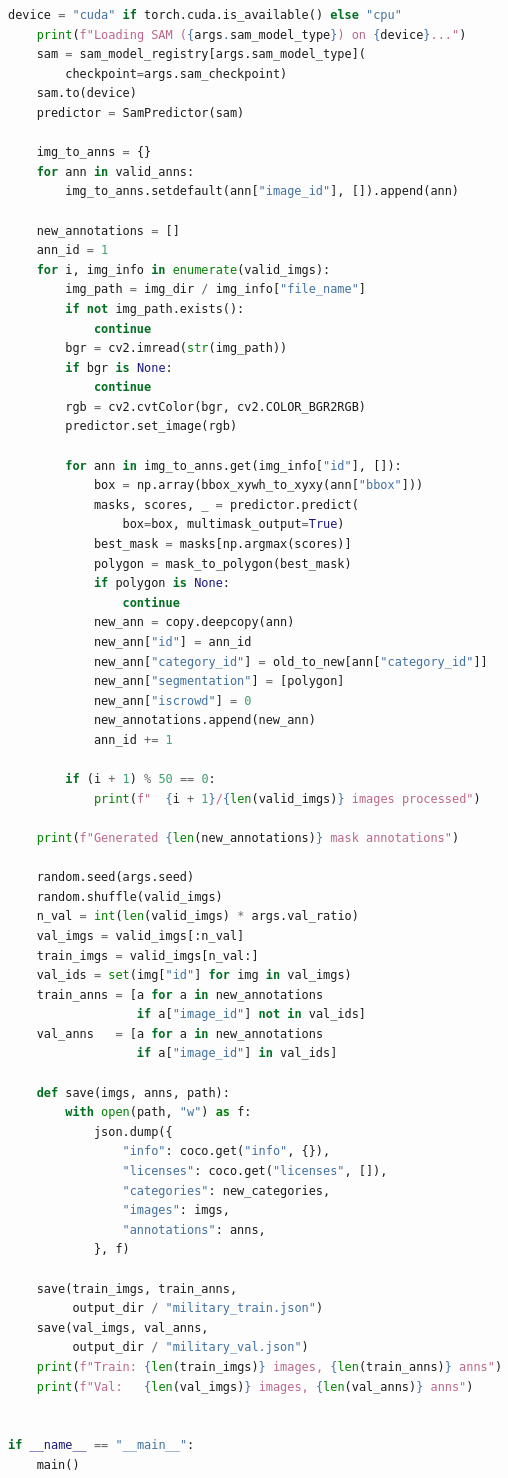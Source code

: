 \documentclass[14pt,a4paper]{extreport}
\begin{document}
\begin{lstlisting}[language=Python]
    device = "cuda" if torch.cuda.is_available() else "cpu"
    print(f"Loading SAM ({args.sam_model_type}) on {device}...")
    sam = sam_model_registry[args.sam_model_type](
        checkpoint=args.sam_checkpoint)
    sam.to(device)
    predictor = SamPredictor(sam)

    img_to_anns = {}
    for ann in valid_anns:
        img_to_anns.setdefault(ann["image_id"], []).append(ann)

    new_annotations = []
    ann_id = 1
    for i, img_info in enumerate(valid_imgs):
        img_path = img_dir / img_info["file_name"]
        if not img_path.exists():
            continue
        bgr = cv2.imread(str(img_path))
        if bgr is None:
            continue
        rgb = cv2.cvtColor(bgr, cv2.COLOR_BGR2RGB)
        predictor.set_image(rgb)

        for ann in img_to_anns.get(img_info["id"], []):
            box = np.array(bbox_xywh_to_xyxy(ann["bbox"]))
            masks, scores, _ = predictor.predict(
                box=box, multimask_output=True)
            best_mask = masks[np.argmax(scores)]
            polygon = mask_to_polygon(best_mask)
            if polygon is None:
                continue
            new_ann = copy.deepcopy(ann)
            new_ann["id"] = ann_id
            new_ann["category_id"] = old_to_new[ann["category_id"]]
            new_ann["segmentation"] = [polygon]
            new_ann["iscrowd"] = 0
            new_annotations.append(new_ann)
            ann_id += 1

        if (i + 1) % 50 == 0:
            print(f"  {i + 1}/{len(valid_imgs)} images processed")

    print(f"Generated {len(new_annotations)} mask annotations")

    random.seed(args.seed)
    random.shuffle(valid_imgs)
    n_val = int(len(valid_imgs) * args.val_ratio)
    val_imgs = valid_imgs[:n_val]
    train_imgs = valid_imgs[n_val:]
    val_ids = set(img["id"] for img in val_imgs)
    train_anns = [a for a in new_annotations
                  if a["image_id"] not in val_ids]
    val_anns   = [a for a in new_annotations
                  if a["image_id"] in val_ids]

    def save(imgs, anns, path):
        with open(path, "w") as f:
            json.dump({
                "info": coco.get("info", {}),
                "licenses": coco.get("licenses", []),
                "categories": new_categories,
                "images": imgs,
                "annotations": anns,
            }, f)

    save(train_imgs, train_anns,
         output_dir / "military_train.json")
    save(val_imgs, val_anns,
         output_dir / "military_val.json")
    print(f"Train: {len(train_imgs)} images, {len(train_anns)} anns")
    print(f"Val:   {len(val_imgs)} images, {len(val_anns)} anns")


if __name__ == "__main__":
    main()
\end{lstlisting}
\end{document}
